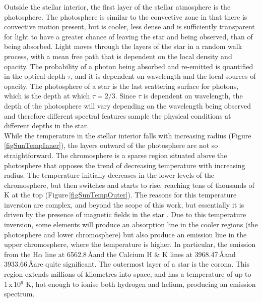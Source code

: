 Outside the stellar interior, the first layer of the stellar atmosphere is the photosphere. The photosphere is similar to the convective zone in that there is convective motion present, but is cooler, less dense and is sufficiently transparent for light to have a greater chance of leaving the star and being observed, than of being absorbed. Light moves through the layers of the star in a random walk process, with a mean free path that is dependent on the local density and opacity. The probability of a photon being absorbed and re-emitted is quantified in the optical depth $\tau$, and it is dependent on wavelength and the local sources of opacity. The photosphere of a star is the last scattering surface for photons, which is the depth at which $\tau=2/3$. Since $\tau$ is dependent on wavelength, the depth of the photosphere will vary depending on the wavelength being observed and therefore different spectral features sample the physical conditions at different depths in the star.\\

While the temperature in the stellar interior falls with increasing radius (Figure\,\ref{figSunTempInner}), the layers outward of the photosphere are not so straightforward. The chromosphere is a sparse region situated above the photosphere that opposes the trend of decreasing temperature with increasing radius. The temperature initially decreases in the lower levels of the chromosphere, but then switches and starts to rise, reaching tens of thousands of K at the top (Figure\,\ref{figSunTempOuter}). The reasons for this temperature inversion are complex, and beyond the scope of this work, but essentially it is driven by the presence of magnetic fields in the star \citep{2004Goodman}. Due to this temperature inversion, some elements will produce an absorption line in the cooler regions (the photosphere and lower chromosphere) but also produce an emission line in the upper chromosphere, where the temperature is higher. In particular, the emission from the H$\alpha$ line at 6562.8\,\AA\;and the Calcium H \& K lines at 3968.47\,\AA\;and 3933.66\,\AA\;are quite significant. The outermost layer of a star is the corona. This region extends millions of kilometres into space, and has a temperature of up to 1\,x\,10$^{6}$ K, hot enough to ionise both hydrogen and helium, producing an emission spectrum.\\

